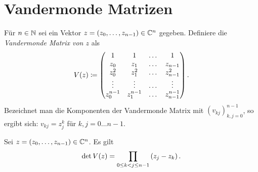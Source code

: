 \section{Vandermonde Matrizen}
\begin{mydef}
    Für $n \in \mathbb{N}$ sei ein Vektor $z = (z_0, \dots, z_{n-1}) \in \mathbb{C}^n$ gegeben.
    Definiere die \emph{Vandermonde Matrix von $z$} als
    \[
        \text{$V(z)$} \coloneqq \begin{pmatrix}
            1         & 1         & \dots & 1 \\
            z_0       & z_1       & \dots & z_{n-1} \\
            z_0^2     & z_1^2     & \dots & z_{n-1}^2 \\
            \vdots    & \vdots    & \dots & \vdots \\
            z_0^{n-1} & z_1^{n-1} & \dots & z_{n-1}^{n-1}
        \end{pmatrix}.
    \]
    Bezeichnet man die Komponenten der Vandermonde Matrix mit
    $\left( v_{kj} \right)_{k,j = 0}^{n-1}$, so ergibt sich:
    $ v_{kj} = z_j^k $ für $k, j = 0 \dots n-1$.
\end{mydef}

\begin{lemma}
    Sei $z = (z_0, \dots, z_{n-1}) \in \mathbb{C}^n$.
    Es gilt
    \[
        \det \text{$V(z)$} = \prod_{0 \leq k < j \leq n-1} \left( z_j - z_k \right).
    \]
\end{lemma}

